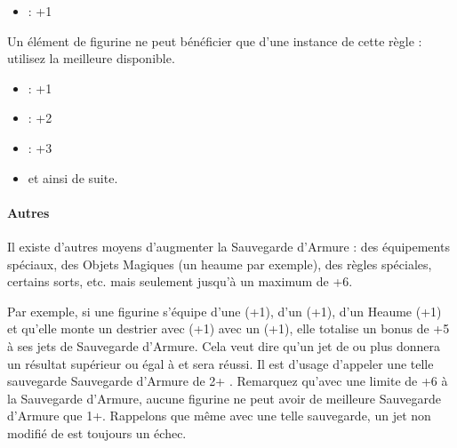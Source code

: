 \begin{multicols}{2}
\noindent\begin{itemize}[label={-}, topsep=0cm, itemsep=0pt]
\item \shield{} : +1
\end{itemize}

\vspace{3.25ex plus 1ex minus .2ex}
\begin{center}\noindent\textbf{\innatedefence{}}\end{center}
\vspace{1.5ex plus .2ex}

Un élément de figurine ne peut bénéficier que d'une instance de cette règle : utilisez la meilleure disponible.

\noindent\begin{itemize}[label={-}, topsep=0cm, itemsep=0pt]
\item {} : +1
\item {} : +2
\item {} : +3
\item et ainsi de suite.
\end{itemize}

\end{multicols}

\paragraph{Autres}

Il existe d'autres moyens d'augmenter la Sauvegarde d'Armure : des équipements spéciaux, des Objets Magiques (un heaume par exemple), des règles spéciales, certains sorts, etc. mais seulement jusqu'à un maximum de +6.

Par exemple, si une figurine s'équipe d'une \la{} (+1), d'un \shield{} (+1), d'un Heaume (+1) et qu'elle monte un destrier avec  (+1) avec un \barding{} (+1), elle totalise un bonus de +5 à ses jets de Sauvegarde d'Armure. Cela veut dire qu'un jet de  ou plus donnera un résultat supérieur ou égal à  et sera réussi. Il est d'usage d'appeler une telle sauvegarde \og Sauvegarde d'Armure de 2+ \fg{}. Remarquez qu'avec une limite de +6 à la Sauvegarde d'Armure, aucune figurine ne peut avoir de meilleure Sauvegarde d'Armure que 1+. Rappelons que même avec une telle sauvegarde, un jet non modifié de  est toujours un échec.
